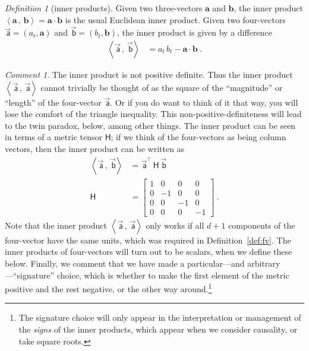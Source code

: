 \documentclass[10pt]{article}
\newcounter{par}
\theoremstyle{remark}
\newtheorem{definition}{Definition}
\newcommand{\defref}[1]{Definition~\ref{#1}}
\theoremstyle{remark}
\newtheorem*{remark}{Comment}
\newcommand{\metric}{\mathsf{H}}
\newcommand\upvec[1]{\!\vec{\,\mathrm{#1}}}
\newcommand{\tv}[1]{{\mathbf{#1}}} %
\newcommand{\fv}[1]{\upvec{\mathsf{#1}}} %
\newcommand{\inner}[2]{\left<{#1}\,,\,{#2}\right>}
\begin{document}
\begin{definition}[inner products]\label{def:inner}
    Given two three-vectors $\tv{a}$ and $\tv{b}$, the inner product $\inner{\tv{a}}{\tv{b}}=\tv{a}\cdot\tv{b}$ is the usual Euclidean inner product.
    Given two four-vectors $\fv{a}=(a_t,\tv{a})$ and $\fv{b}=(b_t,\tv{b})$, the inner product is given by a difference
    \begin{align}
        \inner{\fv{a}}{\fv{b}} &= a_t\,b_t - \tv{a}\cdot\tv{b} ~.
    \end{align}
\end{definition}
\begin{remark}
    The inner product is not positive definite.
    Thus the inner product $\inner{\fv{a}}{\fv{a}}$ cannot trivially be thought of as the square of the ``magnitude'' or ``length'' of the four-vector $\fv{a}$.
    Or if you do want to think of it that way, you will lose the comfort of the triangle inequality.
    This non-positive-definiteness will lead to the twin paradox, below, among other things.
    The inner product can be seen in terms of a metric tensor $\metric$; if we think of the four-vectors as being column vectors, then the inner product can be written as
    \begin{align}
        \inner{\fv{a}}{\fv{b}} &= \fv{a}^\top\,\metric\,\fv{b} \\
        \metric &= \begin{bmatrix}1 &  0 &  0 &  0\\
                                  0 & -1 &  0 &  0\\
                                  0 &  0 & -1 &  0\\
                                  0 &  0 &  0 & -1\end{bmatrix} ~.
    \end{align}
    Note that the inner product $\inner{\fv{a}}{\fv{a}}$ only works if all $d+1$ components of the four-vector have the same units, which was required in \defref{def:fv}.
    The inner products of four-vectors will turn out to be scalars, when we define these below.
    Finally, we comment that we have made a particular---and arbitrary---``signature'' choice, which is whether to make the first element of the metric positive and the rest negative, or the other way around.\footnote{The signature choice will only appear in the interpretation or management of the \emph{signs} of the inner products, which appear when we consider causality, or take square roots.}
\end{remark}
\end{document}
